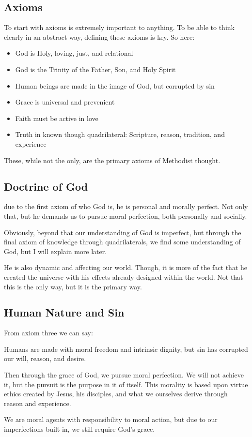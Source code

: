\subsection{Axioms}
\par To start with axioms is extremely important to anything. To be able to think clearly in an abstract way, defining these axioms is key. So here:
\begin{itemize}
    \item God is Holy, loving, just, and relational
    \item God is the Trinity of the Father, Son, and Holy Spirit
    \item Human beings are made in the image of God, but corrupted by sin
    \item Grace is universal and prevenient
    \item Faith must be active in love
    \item Truth in known though quadrilateral: Scripture, reason, tradition, and experience
\end{itemize}
\par These, while not the only, are the primary axioms of Methodist thought.
\subsection{Doctrine of God}
\par due to the first axiom of who God is, he is personal and morally perfect. Not only that, but he demands us to pursue moral perfection, both personally and socially.
\par Obviously, beyond that our understanding of God is imperfect, but through the final axiom of knowledge through quadrilaterals, we find some understanding of God, but I will explain more later.
\par He is also dynamic and affecting our world. Though, it is more of the fact that he created the universe with his effects already designed within the world. Not that this is the only way, but it is the primary way. 
\subsection{Human Nature and Sin}
\par From axiom three we can say:
\par Humans are made with moral freedom and intrinsic dignity, but sin has corrupted our will, reason, and desire.
\par Then through the grace of God, we pursue moral perfection. We will not achieve it, but the pursuit is the purpose in it of itself. This morality is based upon virtue ethics created by Jesus, his disciples, and what we ourselves derive through reason and experience.
\par We are moral agents with responsibility to moral action, but due to our imperfections built in, we still require God's grace.
